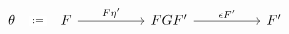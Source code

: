 \[\begin{tikzcd}
	\theta & F && {FGF'} && {F'}
	\arrow["{F\eta'}", from=1-2, to=1-4]
	\arrow["{\epsilon F'}", from=1-4, to=1-6]
	\arrow["{:=}"{description}, draw=none, from=1-1, to=1-2]
\end{tikzcd}\]